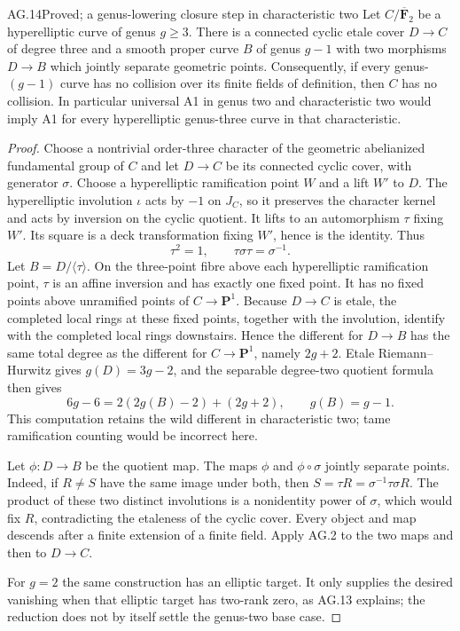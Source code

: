 \begin{claim}{AG.14}{Proved; a genus-lowering closure step in characteristic two}
Let $C/\overline{\mathbf F}_2$ be a hyperelliptic curve of
genus $g\ge3$. There is a connected cyclic etale cover
$D\to C$ of degree three and a smooth proper curve $B$
of genus $g-1$ with two morphisms $D\to B$ which jointly
separate geometric points. Consequently, if every genus-$(g-1)$
curve has no collision over its finite fields of definition,
then $C$ has no collision. In particular universal A1 in
genus two and characteristic two would imply A1 for every
hyperelliptic genus-three curve in that characteristic.
\end{claim}
\begin{proof}
Choose a nontrivial order-three character of the geometric
abelianized fundamental group of $C$ and let $D\to C$ be
its connected cyclic cover, with generator $\sigma$.
Choose a hyperelliptic ramification point $W$ and a lift
$W'$ to $D$. The hyperelliptic involution $\iota$ acts by
$-1$ on $J_C$, so it preserves the character kernel and
acts by inversion on the cyclic quotient. It lifts to an
automorphism $\tau$ fixing $W'$. Its square is a deck
transformation fixing $W'$, hence is the identity.
Thus
\[
            \tau^2=1,\qquad \tau\sigma\tau=\sigma^{-1}.
\]
Let $B=D/\langle\tau\rangle$. On the three-point fibre
above each hyperelliptic ramification point, $\tau$ is an
affine inversion and has exactly one fixed point. It has
no fixed points above unramified points of $C\to\mathbf P^1$.
Because $D\to C$ is etale, the completed local rings at
these fixed points, together with the involution, identify
with the completed local rings downstairs. Hence the
different for $D\to B$ has the same total degree as the
different for $C\to\mathbf P^1$, namely $2g+2$.
Etale Riemann--Hurwitz gives $g(D)=3g-2$, and the
separable degree-two quotient formula then gives
\[
 6g-6=2(2g(B)-2)+(2g+2),\qquad g(B)=g-1.
\]
This computation retains the wild different in characteristic
two; tame ramification counting would be incorrect here.

Let $\phi:D\to B$ be the quotient map. The maps $\phi$
and $\phi\circ\sigma$ jointly separate points. Indeed, if
$R\ne S$ have the same image under both, then
$S=\tau R=\sigma^{-1}\tau\sigma R$. The product of
these two distinct involutions is a nonidentity power of
$\sigma$, which would fix $R$, contradicting the etaleness
of the cyclic cover. Every object and map descends after
a finite extension of a finite field. Apply AG.2 to the
two maps and then to $D\to C$.

For $g=2$ the same construction has an elliptic target.
It only supplies the desired vanishing when that elliptic
target has two-rank zero, as AG.13 explains; the reduction
does not by itself settle the genus-two base case.
\end{proof}

